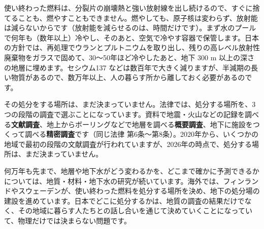 使い終わった燃料は、分裂片の崩壊熱と強い放射線を出し続けるので、すぐに捨てることも、燃やすこともできません。燃やしても、原子核は変わらず、放射能は減らないからです（放射能を減らせるのは、時間だけです）。まず水のプールで何年も（数年以上）冷やし、そのあと、空気で冷やす容器で保管します。日本の方針では、再処理でウランとプルトニウムを取り出し、残りの高レベル放射性廃棄物をガラスで固めて、30〜50年ほど冷やしたあと、地下 300 m 以上の深さの地層に埋めます。セシウム137 などは数百年で大きく減りますが、半減期の長い物質があるので、数万年以上、人の暮らす所から離しておく必要があるのです。

その処分をする場所は、まだ決まっていません。法律では、処分する場所を、3つの段階の調査で選ぶことになっています。資料で地震・火山などの記録を調べる\textbf{文献調査}、地上からボーリングなどで地層を調べる\textbf{概要調査}、地下に施設をつくって調べる\textbf{精密調査}です（同じ法律 第6条〜第8条）。2020年から、いくつかの地域で最初の段階の文献調査が行われていますが、2026年の時点で、処分する場所は、まだ決まっていません。

\begin{phmada}[高レベル放射性廃棄物の処分地は？]
何万年も先まで、地層や地下水がどう変わるかを、どこまで確かに予測できるかについては、地質・材料・地下水の研究が続いています。海外では、フィンランドやスウェーデンが、使い終わった燃料を処分する場所を決め、地下の処分場の建設を進めています。日本でどこに処分するかは、地質の調査の結果だけでなく、その地域に暮らす人たちとの話し合いを通じて決めていくことになっていて、物理だけでは決まらない問題です。
\end{phmada}

